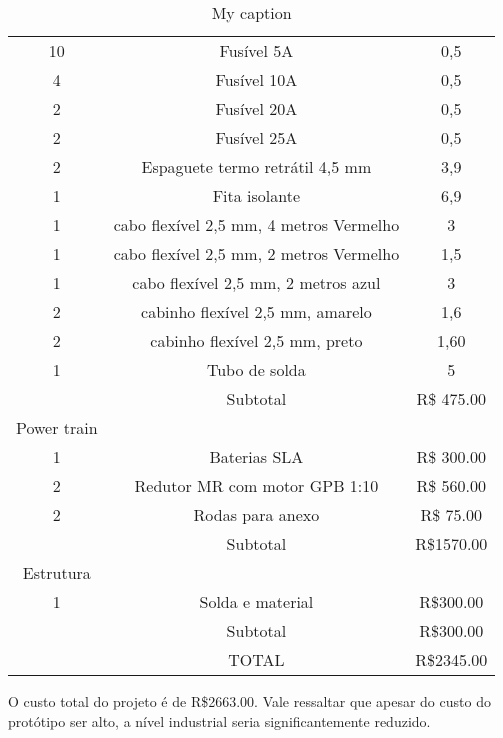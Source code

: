 \begin{table}[!ht]
{\begin{tabular}{|c|c|c|}
10 & Fusível 5A & 0,5 \\
4 & Fusível 10A & 0,5 \\
2 & Fusível 20A & 0,5 \\
2 & Fusível 25A & 0,5 \\
2 & Espaguete termo retrátil 4,5 mm & 3,9 \\
1 & Fita isolante & 6,9 \\
1 & cabo flexível 2,5 mm, 4 metros Vermelho & 3 \\
1 & cabo flexível 2,5 mm, 2 metros Vermelho & 1,5 \\
1 & cabo flexível 2,5 mm, 2 metros azul & 3 \\
2 & cabinho flexível 2,5 mm, amarelo & 1,6 \\
2 & cabinho flexível 2,5 mm, preto & 1,60 \\
1 & Tubo de solda & 5 \\
 & Subtotal & R\$ 475.00 \\ \hline
Power train &  &  \\
1 & Baterias SLA & R\$ 300.00 \\
2 & Redutor MR com motor GPB 1:10 & R\$ 560.00 \\
2 & Rodas para anexo & R\$ 75.00 \\
 & Subtotal & R\$1570.00 \\ \hline
Estrutura &  &  \\
1 & Solda e material & R\$300.00 \\
 & Subtotal & R\$300.00 \\ \hline
 & TOTAL & R\$2345.00 \\ \hline
\end{tabular}
}
\caption{My caption}
\label{tab:custos_tabela}
\end{table}

O custo total do projeto é de R\$2663.00.  Vale ressaltar que apesar do custo do protótipo ser alto, a nível industrial seria significantemente reduzido.
